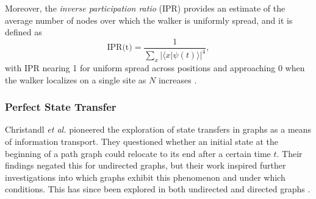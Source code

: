 \documentclass[main.tex]{subfiles}
\begin{document}
Moreover, the \textit{inverse participation ratio} (IPR) provides an estimate
of the average number of nodes over which the walker is uniformly spread, and
it is defined as
\begin{equation}
    \text{IPR(t)} = \frac{1}{\sum_{x} |\langle x | \psi(t) \rangle|^4},
\end{equation} 
with IPR nearing 1 for uniform spread across positions and approaching 0 when
the walker localizes on a single site as $N$ increases \cite{Danaci2021}.


%
%

\subsubsection{Perfect State Transfer}

Christandl \textit{et al.} \cite{christandlPerfect04} pioneered the exploration
of state transfers in graphs as a means of information transport. They
questioned whether an initial state at the beginning of a path graph could
relocate to its end after a certain time $t$. Their findings negated this for
undirected graphs, but their work inspired further investigations into which
graphs exhibit this phenomenon and under which conditions. This has since been
explored in both undirected \cite{Coutinho2014, Cheung2014, Zhou2014} and
directed graphs \cite{Lato2020, Cameron2014}.

\end{document}
